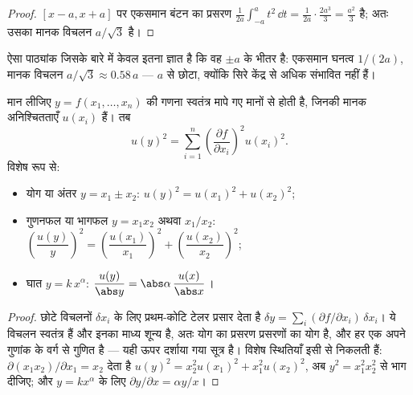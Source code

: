 \begin{proof}
$[x - a, x + a]$ पर एकसमान बंटन का प्रसरण
$\frac{1}{2a}\int_{-a}^{a} t^2\,\dd t = \frac{1}{2a}\cdot\frac{2a^3}{3}
= \frac{a^2}{3}$ है; अतः उसका मानक विचलन $a/\sqrt3$ है।
\end{proof}

\begin{omfigure}

{\small ऐसा पाठ्यांक जिसके बारे में केवल इतना ज्ञात है कि वह $\pm a$ के भीतर
है: एकसमान घनत्व $1/(2a)$, मानक विचलन $a/\sqrt3 \approx 0.58\,a$ --- $a$ से
छोटा, क्योंकि सिरे केंद्र से अधिक संभावित नहीं हैं।}
\end{omfigure}

\begin{theorem}[संयुक्त अनिश्चितता]\label{thm:b1:units-dimensions:propagation}
मान लीजिए $y = f(x_1, \dots, x_n)$ की गणना स्वतंत्र मापे गए मानों से होती है,
जिनकी मानक अनिश्चितताएँ $u(x_i)$ हैं। तब
\[
u(y)^2 = \sum_{i=1}^n \left(\frac{\partial f}{\partial x_i}\right)^2 u(x_i)^2 .
\]
विशेष रूप से:
\begin{itemize}
  \item योग या अंतर $y = x_1 \pm x_2$:
        $u(y)^2 = u(x_1)^2 + u(x_2)^2$;
  \item गुणनफल या भागफल $y = x_1 x_2$ अथवा $x_1/x_2$:
        $\left(\dfrac{u(y)}{y}\right)^2 = \left(\dfrac{u(x_1)}{x_1}\right)^2
        + \left(\dfrac{u(x_2)}{x_2}\right)^2$;
  \item घात $y = k\,x^\alpha$: $\dfrac{u(y)}{\abs y} = \abs\alpha\,\dfrac{u(x)}{\abs x}$।
\end{itemize}
\end{theorem}

\begin{proof}
छोटे विचलनों $\delta x_i$ के लिए प्रथम-कोटि टेलर प्रसार देता है
$\delta y = \sum_i (\partial f/\partial x_i)\,\delta x_i$। ये विचलन स्वतंत्र
हैं और इनका माध्य शून्य है, अतः योग का प्रसरण प्रसरणों का योग है, और हर एक
अपने गुणांक के वर्ग से गुणित है --- यही ऊपर दर्शाया गया सूत्र है। विशेष
स्थितियाँ इसी से निकलती हैं: $\partial(x_1 x_2)/\partial x_1 = x_2$ देता है
$u(y)^2 = x_2^2 u(x_1)^2 + x_1^2 u(x_2)^2$, अब $y^2 = x_1^2 x_2^2$ से भाग
दीजिए; और $y = kx^\alpha$ के लिए $\partial y/\partial x = \alpha y/x$।
\end{proof}


